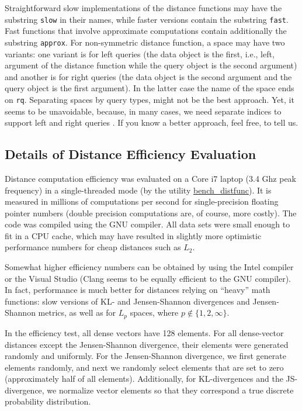 \documentclass[runningheads,a4paper]{llncs}
\newcommand{\replocfile}{https://github.com/searchivarius/NonMetricSpaceLib/blob/pserv/}
\newcommand{\ttt}[1]{\texttt{#1}}
\begin{document}
{Straightforward slow implementations of the distance functions may have the substring \ttt{slow}
in their names, while faster versions contain the substring \ttt{fast}.
Fast functions that involve approximate computations contain additionally the substring \ttt{approx}.
For non-symmetric distance function, a space may have two variants: one variant is for left
queries (the data object is the first, i.e., left, argument of the distance function 
while the query object
is the second argument) 
and another is for right queries (the data object is the second argument and the query object is the first argument).
In the latter case the name of the space ends on \ttt{rq}.
Separating spaces by query types, might not be the best approach.
Yet, it seems to be unavoidable, because, in many cases,
we need separate indices to support left and right queries \cite{Cayton2008}.
If you know a better approach, feel free, to tell us.

\subsection{Details of Distance Efficiency Evaluation}\label{SectionDistEvalDetails}
Distance computation efficiency was evaluated on a Core i7 laptop (3.4 Ghz peak frequency)
in a single-threaded mode (by the utility \href{\replocfile similarity_search/test/bench_distfunc.cc}{bench\_distfunc}).
It is measured in millions of computations per second for single-precision
floating pointer numbers (double precision computations are, of course, more costly). 
The code was compiled using the GNU compiler. 
All data sets were small enough to fit in a CPU cache, which may have resulted in slightly more optimistic
performance numbers for cheap distances such as $L_2$.

Somewhat higher efficiency numbers can be obtained by using the Intel compiler
or the Visual Studio (Clang seems to be equally efficient to the GNU compiler).
In fact, performance is much better for distances relying on ``heavy'' math functions:
slow versions of KL- and Jensen-Shannon divergences and Jensen-Shannon metrics, 
as well as for $L_p$ spaces,
where $p \not\in\{1,2,\infty\}$.

In the efficiency test, all dense vectors have 128 elements.
For all dense-vector distances except the Jensen-Shannon divergence,
their elements were generated randomly and uniformly.
For the Jensen-Shannon divergence, we first generate elements randomly,
and next we randomly select elements that are set to zero (approximately half of all elements). 
Additionally, for KL-divergences and the JS-divergence,
we normalize vector elements so that they correspond a true discrete probability distribution. 

}
\end{document}
